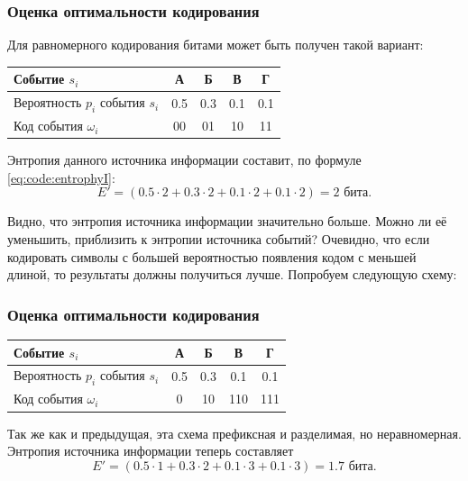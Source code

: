 \begin{frame}
    \frametitle{Оценка оптимальности кодирования}
    
    Для равномерного кодирования битами может быть получен такой вариант:

    \begin{center}
        \begin{tabular}{|l|c|c|c|c|}
            \hline
            Событие $s_i$                   &А      &Б      &В      &Г   \\ \hline
            Вероятность $p_i$ события $s_i$ &0.5    &0.3    &0.1    &0.1 \\ \hline
            Код события $\omega_i$          &00     &01     &10     &11  \\ \hline
        \end{tabular}
    \end{center}
    
    Энтропия данного источника информации составит, по формуле \eqref{eq:code:entrophyI}:
    \[
        E'=(0.5\cdot 2+0.3\cdot 2+0.1\cdot 2+0.1\cdot 2)=2 \text{ бита}.
    \]
\end{frame}
    
Видно, что энтропия источника информации значительно больше. Можно ли её уменьшить, приблизить к энтропии источника событий? Очевидно, что если кодировать символы с большей вероятностью появления кодом с меньшей длиной, то результаты должны получиться лучше. Попробуем следующую схему:
    
\begin{frame}
    \frametitle{Оценка оптимальности кодирования}
    
    \begin{center}
        \begin{tabular}{|l|c|c|c|c|}
            \hline
            Событие $s_i$                   &А      &Б      &В      &Г   \\ \hline
            Вероятность $p_i$ события $s_i$ &0.5    &0.3    &0.1    &0.1 \\ \hline
            Код события $\omega_i$          &0      &10     &110    &111 \\ \hline
        \end{tabular}
    \end{center}
    
    Так же как и предыдущая, эта схема префиксная и разделимая, но неравномерная. Энтропия источника информации теперь составляет
    \[
        E'=(0.5\cdot 1+0.3\cdot 2+0.1\cdot 3+0.1\cdot 3)=1.7\text{ бита}.
    \]
\end{frame}

